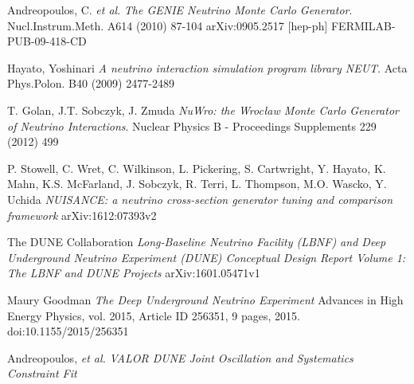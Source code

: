 \documentclass[12pt]{article}
\begin{document}
\begin{thebibliography}{1}

Andreopoulos, C. \textit{et al}.
\textit{The GENIE Neutrino Monte Carlo Generator}.
Nucl.Instrum.Meth. A614 (2010) 87-104 arXiv:0905.2517 [hep-ph] FERMILAB-PUB-09-418-CD

Hayato, Yoshinari 
\textit{A neutrino interaction simulation program library NEUT}.
Acta Phys.Polon. B40 (2009) 2477-2489

T. Golan, J.T. Sobczyk, J. Zmuda
\textit{NuWro: the Wrocław Monte Carlo Generator of Neutrino Interactions}.
Nuclear Physics B - Proceedings Supplements 229 (2012) 499

P. Stowell, C. Wret, C. Wilkinson, L. Pickering, S. Cartwright, Y. Hayato, K. Mahn, K.S. McFarland, J. Sobczyk, R. Terri, L. Thompson, M.O. Wascko, Y. Uchida
\textit{NUISANCE: a neutrino cross-section generator tuning and comparison framework}
arXiv:1612:07393v2

The DUNE Collaboration
\textit{Long-Baseline Neutrino Facility (LBNF) and Deep Underground Neutrino Experiment (DUNE) Conceptual Design Report Volume 1: The LBNF and DUNE Projects}
arXiv:1601.05471v1

Maury Goodman
\textit{The Deep Underground Neutrino Experiment}
Advances in High Energy Physics, vol. 2015, Article ID 256351, 9 pages, 2015. doi:10.1155/2015/256351

Andreopoulos, \textit{et al.}
\textit{VALOR DUNE Joint Oscillation and Systematics Constraint Fit}


\end{thebibliography}
\end{document}
